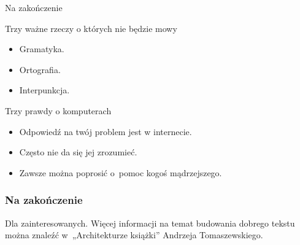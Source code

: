 \documentclass[10pt,t]{beamer}
\begin{document}
\begin{frame}{Na zakończenie}


  Trzy ważne rzeczy o których nie będzie mowy
  \begin{itemize}
    \RaggedRight

  \item Gramatyka.

  \item Ortografia.

  \item Interpunkcja.

  \end{itemize}

  Trzy prawdy o komputerach
  \begin{itemize}
    \RaggedRight

  \item Odpowiedź na twój problem jest w internecie.

  \item Często nie da się jej zrozumieć.

  \item Zawsze można poprosić o~pomoc kogoś mądrzejszego.

  \end{itemize}

\end{frame}





\begin{frame}
  \frametitle{Na zakończenie}


  Dla zainteresowanych.
  Więcej informacji na temat budowania dobrego tekstu można znaleźć
  w~„Architekturze książki” Andrzeja Tomaszewskiego.

\end{frame}










\appendix

















{}



\end{document}
